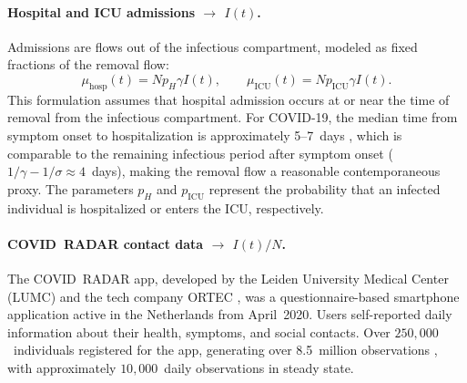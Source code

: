 \documentclass[11pt]{article}
\begin{document}
\paragraph{Hospital and ICU admissions $\to$ $I(t)$.}
Admissions are flows out of the infectious compartment, modeled as fixed fractions of the removal flow:
\begin{equation}\label{eq:obs-hosp}
  \mu_{\mathrm{hosp}}(t) = Np_H\gamma I(t), \qquad \mu_{\mathrm{ICU}}(t) = Np_{\mathrm{ICU}}\gamma I(t).
\end{equation}
This formulation assumes that hospital admission occurs at or near the time of removal from the infectious compartment. For COVID-19, the median time from symptom onset to hospitalization is approximately 5--7~days \citep{Dongelmans2022}, which is comparable to the remaining infectious period after symptom onset ($1/\gamma - 1/\sigma \approx 4$~days), making the removal flow a reasonable contemporaneous proxy. The parameters $p_H$ and $p_{\mathrm{ICU}}$ represent the probability that an infected individual is hospitalized or enters the ICU, respectively.

\paragraph{COVID~RADAR contact data $\to$ $I(t)/N$.}
The COVID~RADAR app, developed by the Leiden University Medical Center (LUMC) and the tech company ORTEC \citep{vanDijk2021,vanDijk2020}, was a questionnaire-based smartphone application active in the Netherlands from April~2020. Users self-reported daily information about their health, symptoms, and social contacts. Over $250{,}000$~individuals registered for the app, generating over 8.5~million observations \citep{SchootUiterkamp2025}, with approximately $10{,}000$~daily observations in steady state.
\end{document}
